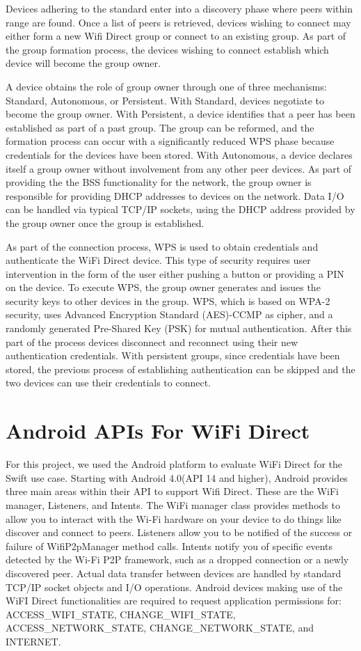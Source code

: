 \documentclass[10pt,twocolumn]{article}
\begin{document}
Devices adhering to the standard enter into a discovery phase where peers within range are found. 
Once a list of peers is retrieved, devices wishing to connect may either form a new  Wifi Direct group or connect to an existing group. 
As part of the group formation process, the devices wishing to connect establish which device will become the group owner.

A device obtains the role of group owner through one of three mechanisms: Standard, Autonomous, or Persistent. 
With Standard, devices negotiate to become the group owner.
With Persistent, a device identifies that a peer has been established as part of a past group. 
The group can be reformed, and the formation process can occur with a significantly reduced WPS phase because credentials for the devices have been stored.
With Autonomous, a device declares itself a group owner without involvement from any other peer devices. 
As part of providing the the BSS functionality for the network, the group owner is responsible for providing DHCP addresses to devices on the network.
Data I/O can be handled via typical TCP/IP sockets, using the DHCP address provided by the group owner once the group is established\cite{wifiwhitepaper}.

As part of the connection process, WPS is used to obtain credentials and authenticate the WiFi Direct device.  
This type of security requires user intervention in the form of the user either pushing a button or providing a PIN on the device.
To execute WPS, the group owner generates and issues the security keys to other devices in the group. 
WPS, which is based on WPA-2 security, uses Advanced Encryption Standard (AES)-CCMP as cipher, and a randomly generated Pre-Shared Key (PSK) for mutual authentication\cite{wifiwhitepaper}.
After this part of the process devices disconnect and reconnect using their new authentication credentials.
With persistent groups, since credentials have been stored, the previous process of establishing authentication can be skipped and the two devices can use their credentials to connect.

\section{Android APIs For WiFi Direct}
For this project, we used the Android platform to evaluate WiFi Direct for the Swift use case.
Starting with Android 4.0(API 14 and higher), Android provides three main areas within their API to support Wifi Direct.
These are the WiFi manager, Listeners, and Intents.
The WiFi manager class provides methods to allow you to interact with the Wi-Fi hardware on your device to do things like discover and connect to peers. 
Listeners allow you to be notified of the success or failure of WifiP2pManager method calls. 
Intents notify you of specific events detected by the Wi-Fi P2P framework, such as a dropped connection or a newly discovered peer. 
Actual data transfer between devices are handled by standard TCP/IP socket objects and I/O operations.
Android devices making use of the WiFI Direct functionalities are required to request application permissions for: ACCESS\_WIFI\_STATE, CHANGE\_WIFI\_STATE, ACCESS\_NETWORK\_STATE, CHANGE\_NETWORK\_STATE, and INTERNET. \cite{androidoverview}
\end{document}
